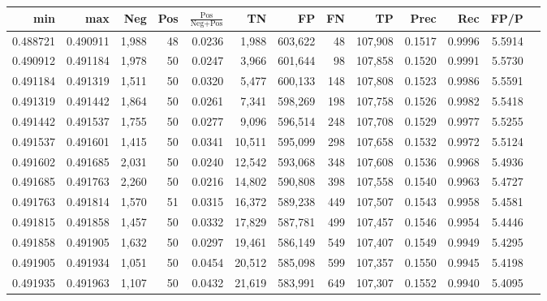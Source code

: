 \begin{tabular}{rrrrrrrrrrrrr}
\toprule
     min &      max &   Neg & Pos & $\frac{\text{Pos}}{\text{Neg}+\text{Pos}}$ &      TN &      FP &      FN &      TP &   Prec &    Rec &   FP/P \\
\midrule
0.488721 & 0.490911 & 1,988 &  48 &                                     0.0236 &   1,988 & 603,622 &      48 & 107,908 & 0.1517 & 0.9996 & 5.5914 \\
0.490912 & 0.491184 & 1,978 &  50 &                                     0.0247 &   3,966 & 601,644 &      98 & 107,858 & 0.1520 & 0.9991 & 5.5730 \\
0.491184 & 0.491319 & 1,511 &  50 &                                     0.0320 &   5,477 & 600,133 &     148 & 107,808 & 0.1523 & 0.9986 & 5.5591 \\
0.491319 & 0.491442 & 1,864 &  50 &                                     0.0261 &   7,341 & 598,269 &     198 & 107,758 & 0.1526 & 0.9982 & 5.5418 \\
0.491442 & 0.491537 & 1,755 &  50 &                                     0.0277 &   9,096 & 596,514 &     248 & 107,708 & 0.1529 & 0.9977 & 5.5255 \\
0.491537 & 0.491601 & 1,415 &  50 &                                     0.0341 &  10,511 & 595,099 &     298 & 107,658 & 0.1532 & 0.9972 & 5.5124 \\
0.491602 & 0.491685 & 2,031 &  50 &                                     0.0240 &  12,542 & 593,068 &     348 & 107,608 & 0.1536 & 0.9968 & 5.4936 \\
0.491685 & 0.491763 & 2,260 &  50 &                                     0.0216 &  14,802 & 590,808 &     398 & 107,558 & 0.1540 & 0.9963 & 5.4727 \\
0.491763 & 0.491814 & 1,570 &  51 &                                     0.0315 &  16,372 & 589,238 &     449 & 107,507 & 0.1543 & 0.9958 & 5.4581 \\
0.491815 & 0.491858 & 1,457 &  50 &                                     0.0332 &  17,829 & 587,781 &     499 & 107,457 & 0.1546 & 0.9954 & 5.4446 \\
0.491858 & 0.491905 & 1,632 &  50 &                                     0.0297 &  19,461 & 586,149 &     549 & 107,407 & 0.1549 & 0.9949 & 5.4295 \\
0.491905 & 0.491934 & 1,051 &  50 &                                     0.0454 &  20,512 & 585,098 &     599 & 107,357 & 0.1550 & 0.9945 & 5.4198 \\
0.491935 & 0.491963 & 1,107 &  50 &                                     0.0432 &  21,619 & 583,991 &     649 & 107,307 & 0.1552 & 0.9940 & 5.4095 \\

\end{tabular}
